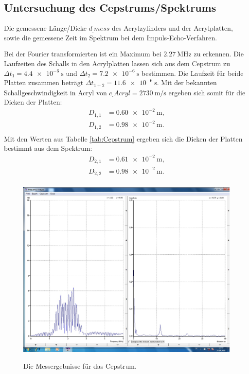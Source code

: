 \subsection{Untersuchung des Cepstrums/Spektrums}

\begin{table}
	\centering
	\caption{Die gemessene Länge/Dicke $d_.{mess}$ des Acrylzylinders und der Acrylplatten, sowie die gemessene Zeit im Spektrum bei dem Impuls-Echo-Verfahren.}
	
	\label{tab:Cepstrum}
\end{table}

\noindent Bei der Fourier transformierten ist ein Maximum bei $\SI{2.27}{\mega\hertz}$ zu erkennen.
Die Laufzeiten des Schalls in den Acrylplatten lassen sich aus dem Cepstrum zu $\Delta t_1=\SI{4.4e-6}{\second}$ und $\Delta t_2=\SI{7.2e-6}{\second}$ bestimmen. Die Laufzeit für beide Platten zusammen beträgt $\Delta t_{1+2}=\SI{11.6e-6}{\second}$. 
Mit der bekannten Schallgeschwindigkeit in Acryl von $c_.{Acryl}=\SI{2730}{\meter\per\second}$ \cite{cAcryl} ergeben sich somit für die Dicken der Platten:
\begin{align*}
D_{1,1}&=\SI{0.60e-2}{\meter}\text{,}\\
D_{1,2}&=\SI{0.98e-2}{\meter}\text{.}\\
\end{align*}
Mit den Werten aus Tabelle \ref{tab:Cepstrum} ergeben sich die Dicken der Platten bestimmt aus dem Spektrum:
\begin{align*}
D_{2,1}&=\SI{0.61e-2}{\meter}\text{,}\\
D_{2,2}&=\SI{0.98e-2}{\meter}\text{.}\\
\end{align*}

\begin{figure}
	\centering
	\caption{Die Messergebnisse für das Cepstrum.}
	\includegraphics[width=\linewidth-30pt,height=\textheight-30pt,keepaspectratio]{content/images/CEPSTRUM.jpg}
	\label{fig:Cepstrum}
\end{figure}

